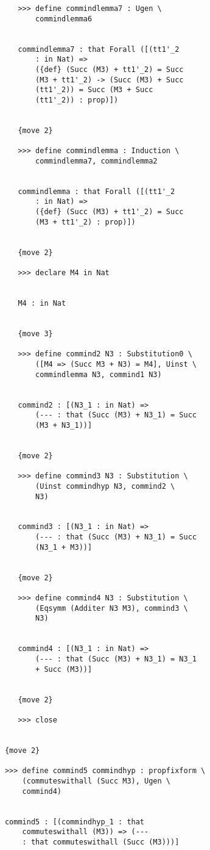 \documentclass[12pt]{article}
\begin{document}
\begin{verbatim}
         >>> define commindlemma7 : Ugen \
             commindlemma6


         commindlemma7 : that Forall ([(tt1'_2 
             : in Nat) => 
             ({def} (Succ (M3) + tt1'_2) = Succ 
             (M3 + tt1'_2) -> (Succ (M3) + Succ 
             (tt1'_2)) = Succ (M3 + Succ 
             (tt1'_2)) : prop)])


         {move 2}

         >>> define commindlemma : Induction \
             commindlemma7, commindlemma2


         commindlemma : that Forall ([(tt1'_2 
             : in Nat) => 
             ({def} (Succ (M3) + tt1'_2) = Succ 
             (M3 + tt1'_2) : prop)])


         {move 2}

         >>> declare M4 in Nat


         M4 : in Nat


         {move 3}

         >>> define commind2 N3 : Substitution0 \
             ([M4 => (Succ M3 + N3) = M4], Uinst \
             commindlemma N3, commind1 N3)


         commind2 : [(N3_1 : in Nat) => 
             (--- : that (Succ (M3) + N3_1) = Succ 
             (M3 + N3_1))]


         {move 2}

         >>> define commind3 N3 : Substitution \
             (Uinst commindhyp N3, commind2 \
             N3)


         commind3 : [(N3_1 : in Nat) => 
             (--- : that (Succ (M3) + N3_1) = Succ 
             (N3_1 + M3))]


         {move 2}

         >>> define commind4 N3 : Substitution \
             (Eqsymm (Additer N3 M3), commind3 \
             N3)


         commind4 : [(N3_1 : in Nat) => 
             (--- : that (Succ (M3) + N3_1) = N3_1 
             + Succ (M3))]


         {move 2}

         >>> close


      {move 2}

      >>> define commind5 commindhyp : propfixform \
          (commuteswithall (Succ M3), Ugen \
          commind4)


      commind5 : [(commindhyp_1 : that 
          commuteswithall (M3)) => (--- 
          : that commuteswithall (Succ (M3)))]



\end{verbatim}
\end{document}

